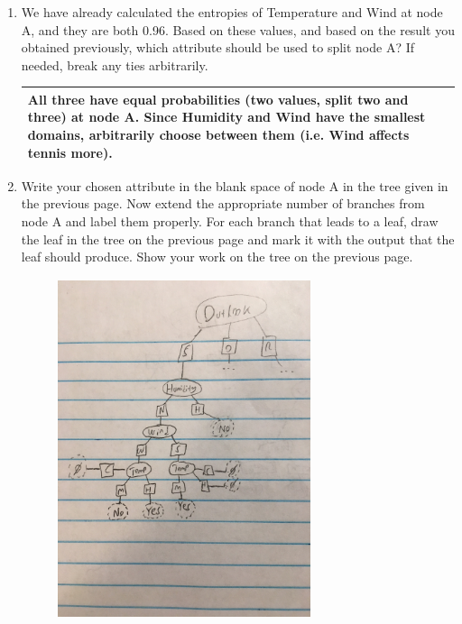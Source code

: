 \documentclass[10pt]{article}
\newenvironment{answer}
    {\begin{center}
    \begin{tabular}{|p{0.9\textwidth}|}
    \hline
    }
    { 
    \\\hline
    \end{tabular} 
    \end{center}
    }
\begin{document}
\begin{enumerate}
\begin{enumerate}
    \item We have already calculated the entropies of Temperature and Wind at node A, and they
      are both 0.96. Based on these values, and based on the result you obtained previously,
      which attribute should be used to split node A? If needed, break any ties arbitrarily.
      \begin{answer}       
All three have equal probabilities (two values, split two and three) at node A. Since Humidity and Wind have the smallest domains, arbitrarily choose between them (i.e. Wind affects tennis more).
      \end{answer}
    \item Write your chosen attribute in the blank space of node A in the tree given in the previous
      page. Now extend the appropriate number of branches from node A and label them
      properly. For each branch that leads to a leaf, draw the leaf in the tree on the previous page
      and mark it with the output that the leaf should produce. Show your work on the tree on
      the previous page.
      \begin{figure}[h!]
        \centering
        \includegraphics[width=0.7\textwidth,height=10cm]{hw3_13.jpg}
      \end{figure}
    \end{enumerate}  
  \end{enumerate}
\end{document}
